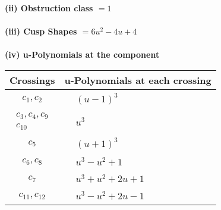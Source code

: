 \documentclass[1p]{elsarticle_modified}
\theoremstyle{definition}
\begin{document}
\flushleft \textbf{(ii) Obstruction class $= 1$}\\~\\
\flushleft \textbf{(iii) Cusp Shapes $= 6 u^2-4 u+4$}\\~\\
\newpage\renewcommand{\arraystretch}{1}
\flushleft \textbf{(iv) u-Polynomials at the component}\newline \\
\begin{tabular}{m{50pt}|m{274pt}}
Crossings & \hspace{64pt}u-Polynomials at each crossing \\
\hline $$\begin{aligned}c_{1},c_{2}\end{aligned}$$&$\begin{aligned}
&(u-1)^3
\end{aligned}$\\
\hline $$\begin{aligned}c_{3},c_{4},c_{9}\\c_{10}\end{aligned}$$&$\begin{aligned}
&u^3
\end{aligned}$\\
\hline $$\begin{aligned}c_{5}\end{aligned}$$&$\begin{aligned}
&(u+1)^3
\end{aligned}$\\
\hline $$\begin{aligned}c_{6},c_{8}\end{aligned}$$&$\begin{aligned}
&u^3- u^2+1
\end{aligned}$\\
\hline $$\begin{aligned}c_{7}\end{aligned}$$&$\begin{aligned}
&u^3+u^2+2 u+1
\end{aligned}$\\
\hline $$\begin{aligned}c_{11},c_{12}\end{aligned}$$&$\begin{aligned}
&u^3- u^2+2 u-1
\end{aligned}$\\
\hline
\end{tabular}\\~\\
\end{document}
